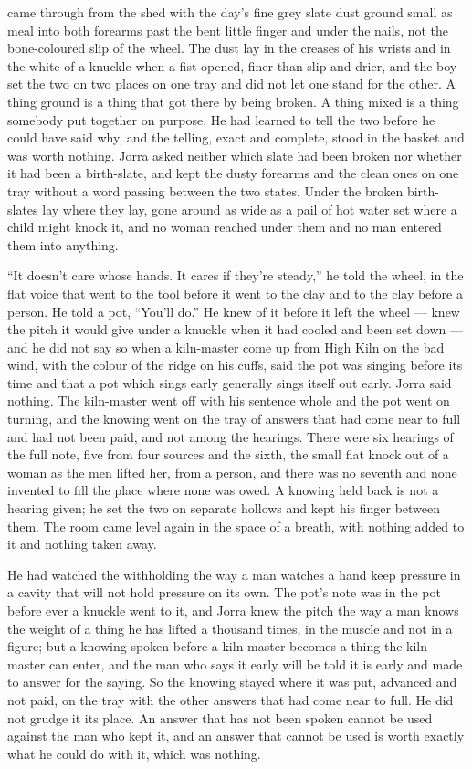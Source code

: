 came through from the shed with the day's fine grey slate dust ground small as meal into both forearms past the bent little finger and under the nails, not the bone-coloured slip of the wheel. The dust lay in the creases of his wrists and in the white of a knuckle when a fist opened, finer than slip and drier, and the boy set the two on two places on one tray and did not let one stand for the other. A thing ground is a thing that got there by being broken. A thing mixed is a thing somebody put together on purpose. He had learned to tell the two before he could have said why, and the telling, exact and complete, stood in the basket and was worth nothing. Jorra asked neither which slate had been broken nor whether it had been a birth-slate, and kept the dusty forearms and the clean ones on one tray without a word passing between the two states. Under  the broken birth-slates lay where they lay, gone around as wide as a pail of hot water set where a child might knock it, and no woman reached under them and no man entered them into anything.

\scenebreak

“It doesn't care whose hands. It cares if they're steady,” he told the wheel, in the flat voice that went to the tool before it went to the clay and to the clay before a person. He told a pot, “You'll do.” He knew  of it before it left the wheel --- knew the pitch it would give under a knuckle when it had cooled and been set down --- and he did not say so when a kiln-master come up from High Kiln on the bad wind, with  the colour of the ridge on his cuffs, said the pot was singing before its time and that a pot which sings early generally sings itself out early. Jorra said nothing. The kiln-master went off with his sentence whole and the pot went on turning, and the knowing went on the tray of answers that had come near to full and had not been paid, and not among the hearings. There were six hearings of the full note, five from four sources and the sixth, the small flat knock out of a woman as the men lifted her, from a person, and there was no seventh and none invented to fill the place where none was owed. A knowing held back is not a hearing given; he set the two on separate hollows and kept his finger between them. The room came level again in the space of a breath, with nothing added to it and nothing taken away.

He had watched the withholding the way a man watches a hand keep pressure in a cavity that will not hold pressure on its own. The pot's note was in the pot before ever a knuckle went to it, and Jorra knew the pitch the way a man knows the weight of a thing he has lifted a thousand times, in the muscle and not in a figure; but a knowing spoken before a kiln-master becomes a thing the kiln-master can enter, and the man who says it early will be told it is early and made to answer for the saying. So the knowing stayed where it was put, advanced and not paid, on the tray with the other answers that had come near to full. He did not grudge it its place. An answer that has not been spoken cannot be used against the man who kept it, and an answer that cannot be used is worth exactly what he could do with it, which was nothing.

